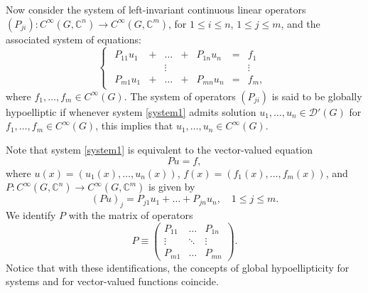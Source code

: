 \documentclass[11pt]{amsart}
\numberwithin{theorem}{section}
\numberwithin{equation}{section}
\theoremstyle{definition}
\numberwithin{example}{section}
\theoremstyle{definition}
\theoremstyle{definition}
\begin{document}
Now consider the system of left-invariant continuous linear operators  $(P_{ji}):C^\infty(G,\mathbb{C}^n)\to C^\infty(G,\mathbb{C}^m)$, for $1\leq i\leq n$, $1\leq j\leq m$, and the associated system of equations:
    \begin{equation}\label{system1}
            \begin{cases}
                \begin{matrix}
        P_{11}u_1&+&\dots &+& P_{1n}u_n&=&f_1\\
        &&\vdots&&&&\vdots\\
        P_{m1}u_1&+&\dots&+&P_{mn}u_n&=&f_m,
    \end{matrix}
            \end{cases}
    \end{equation}
where $f_1,\dots, f_m\in C^\infty(G)$. The system of operators $(P_{ji})$ is said to be globally hypoelliptic if whenever system \eqref{system1} admits solution $u_1,\dots, u_n\in\mathcal{D}'(G)$ for $f_1,\dots, f_m\in C^\infty(G)$, this implies that $u_1,\dots, u_n\in C^\infty(G)$.

\noindent Note that system \eqref{system1} is equivalent to the vector-valued equation
\begin{equation*}
    Pu=f,
\end{equation*}
where $u(x)= (u_1(x),\dots,u_n(x))$,  $f(x)= (f_1(x),\dots,f_m(x))$, and $P: C^\infty(G,\mathbb{C}^n)\to C^\infty(G,\mathbb{C}^m)$ is given by
\begin{equation}\label{eq_operator_P}
    (Pu)_j=P_{j1}u_1+\dots+P_{jn}u_n,\quad 1\leq j\leq m.
\end{equation} 
We identify $P$ with the matrix of operators
\begin{equation*}
    P\equiv\begin{pmatrix}
        P_{11}&\dots&P_{1n}\\
        \vdots&\ddots&\vdots\\
        P_{m1}&\dots&P_{mn}
    \end{pmatrix}.
\end{equation*}
Notice that with these identifications, the concepts of global hypoellipticity for systems and for vector-valued functions coincide.
\end{document}
